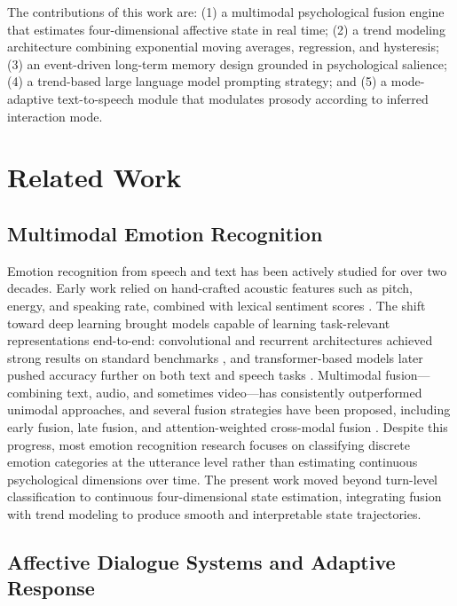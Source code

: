 \documentclass[conference]{IEEEtran}
\begin{document}
The contributions of this work are: (1) a multimodal psychological fusion engine that estimates four-dimensional affective state in real time; (2) a trend modeling architecture combining exponential moving averages, regression, and hysteresis; (3) an event-driven long-term memory design grounded in psychological salience; (4) a trend-based large language model prompting strategy; and (5) a mode-adaptive text-to-speech module that modulates prosody according to inferred interaction mode.

\section{Related Work}

\subsection{Multimodal Emotion Recognition}

Emotion recognition from speech and text has been actively studied for over two decades. Early work relied on hand-crafted acoustic features such as pitch, energy, and speaking rate, combined with lexical sentiment scores \cite{schuller2013interspeech}. The shift toward deep learning brought models capable of learning task-relevant representations end-to-end: convolutional and recurrent architectures achieved strong results on standard benchmarks \cite{trigeorgis2016adieu}, and transformer-based models later pushed accuracy further on both text and speech tasks \cite{pepino2021emotion}. Multimodal fusion---combining text, audio, and sometimes video---has consistently outperformed unimodal approaches, and several fusion strategies have been proposed, including early fusion, late fusion, and attention-weighted cross-modal fusion \cite{zadeh2018memory}. Despite this progress, most emotion recognition research focuses on classifying discrete emotion categories at the utterance level rather than estimating continuous psychological dimensions over time. The present work moved beyond turn-level classification to continuous four-dimensional state estimation, integrating fusion with trend modeling to produce smooth and interpretable state trajectories.

\subsection{Affective Dialogue Systems and Adaptive Response}
\end{document}

